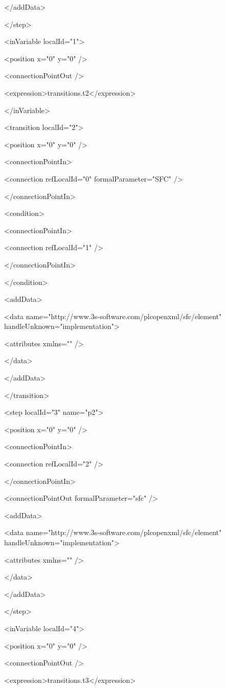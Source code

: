   </addData>

 </step>

 <inVariable localId="1">

  <position x="0" y="0" />

  <connectionPointOut />

  <expression>transitions.t2</expression>

 </inVariable>

 <transition localId="2">

  <position x="0" y="0" />

  <connectionPointIn>

   <connection refLocalId="0" formalParameter="SFC" />

  </connectionPointIn>

  <condition>

   <connectionPointIn>

    <connection refLocalId="1" />

   </connectionPointIn>

  </condition>

  <addData>

   <data name="http://www.3s-software.com/plcopenxml/sfc/element" handleUnknown="implementation">

    <attributes xmlns="" />

   </data>

  </addData>

 </transition>

 <step localId="3" name="p2">

  <position x="0" y="0" />

  <connectionPointIn>

   <connection refLocalId="2" />

  </connectionPointIn>

  <connectionPointOut formalParameter="sfc" />

  <addData>

   <data name="http://www.3s-software.com/plcopenxml/sfc/element" handleUnknown="implementation">

    <attributes xmlns="" />

   </data>

  </addData>

 </step>

 <inVariable localId="4">

  <position x="0" y="0" />

  <connectionPointOut />

  <expression>transitions.t3</expression>

